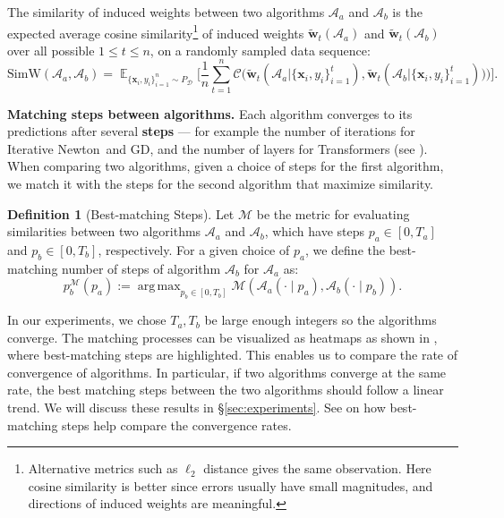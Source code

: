 \documentclass[11pt]{article}
\theoremstyle{plain}
\theoremstyle{definition}
\newtheorem{definition}[theorem]{Definition}
\theoremstyle{remark}
\newcommand{\calA}{{\mathcal{A}}}
\newcommand{\calC}{{\mathcal{C}}}
\renewcommand{\^}[1]{^{(#1)}}
\newcommand{\bx}{\boldsymbol{x}}
\newcommand{\bw}{\boldsymbol{w}}
\newcommand{\newton}{Iterative Newton}
\DeclareMathOperator*{\argmax}{arg\,max}
\renewcommand{\paragraph}[1]{\vspace{1mm}\noindent\textbf{#1}}
\begin{document}
The similarity of induced weights between two algorithms $\calA_a$ and $\calA_b$ is the expected average cosine similarity\footnote{Alternative metrics such as $\ell_2$ distance gives the same observation. Here cosine similarity is better since errors usually have small magnitudes, and directions of induced weights are meaningful.} of induced weights $\tilde{\bw}_t(\calA_a)$ and $\tilde{\bw}_t(\calA_b)$ over all possible $1 \leq t \leq n$, on a randomly sampled data sequence:
\begin{equation*}
    \mathrm{SimW}(\calA_a, \calA_b) =  \mathop{\mathbb E}_{\{\bx_i, y_i\}_{i=1}^{n} \sim P_{\mathcal{D}}} \Bigg[
    \frac{1}{n} \sum_{t=1}^n
    \calC\Big(\tilde{\bw}_t(\calA_a | \{\bx_i, y_i\}_{i=1}^t), \tilde{\bw}_t(\calA_b | \{\bx_i, y_i\}_{i=1}^t))\Big)\Bigg].
\end{equation*}

\paragraph{Matching steps between algorithms.} Each algorithm converges to its predictions after several \textbf{steps} --- for example the number of iterations for \newton\ and GD, and  the number of layers for Transformers (see ). 
When comparing two algorithms, given a choice of steps for the first algorithm, we match it with the steps for the second algorithm that maximize similarity. 
\begin{definition}[Best-matching Steps] Let $\mathcal M$ be the metric for evaluating similarities between two algorithms $\calA_a$ and $\calA_b$, which have steps $p_a \in [0, T_a]$ and $p_b \in [0, T_b]$, respectively. For a given choice of $p_a$, we define the best-matching number of steps of algorithm $\calA_b$ for $\calA_a$ as: 
\begin{equation}
    p_b^{\mathcal M}(p_a) := \argmax_{p_b \in [0, T_b]} \mathcal M(\calA_a(\cdot \mid p_a), \calA_b(\cdot \mid p_b)).
\end{equation} 
\vspace{-3.4mm}
\label{def:matching}
\end{definition}
In our experiments, we chose $T_a, T_b$ be large enough integers so the algorithms converge. The matching processes can be visualized as heatmaps as shown in , where best-matching steps are highlighted. This enables us to compare the rate of convergence of algorithms. 
In particular, if two algorithms converge at the same rate, the best matching steps between the two algorithms should follow a linear trend.
We will discuss these results in \S\ref{sec:experiments}. See  on how best-matching steps help compare the convergence rates.
\end{document}
